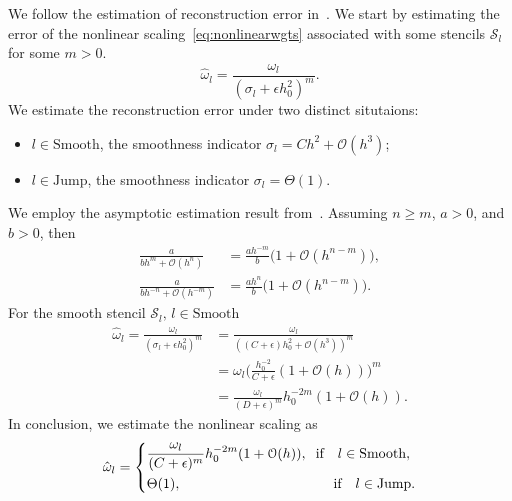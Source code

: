 We follow the estimation of reconstruction error in~\cite{MultiLevelWeno}.
We start by estimating the error of the nonlinear scaling~\eqref{eq:nonlinearwgts} 
associated with some stencils $\mathcal{S}_l$
for some $m>0$.
\begin{equation}
\hat{\omega}_l = \frac{\omega_l}{(\sigma_l + \epsilon h_0^2)^m}.
\end{equation}
We estimate the reconstruction error under two distinct situtaions:
\begin{itemize}
\item $l \in \text{Smooth}$, the smoothness indicator $\sigma_l = Ch^2 + \mathcal{O}(h^3)$; 
\item $l \in \text{Jump}$, the smoothness indicator $\sigma_l = \Theta(1)$.
\end{itemize}
We employ the asymptotic estimation result from~\cite{olver1997asymptotics}. 
Assuming $n\geq m$, 
$a>0$, and $b>0$, then
\begin{equation}\label{eq:asymptoticresult}
\begin{aligned}
\frac{a}{bh^m + \mathcal{O}(h^n)} &= \frac{ah^{-m}}{b} \big(1 + \mathcal{O}(h^{n-m})\big),\\
\frac{a}{bh^{-n} + \mathcal{O}(h^{-m})} &= \frac{ah^{n}}{b} \big(1 + \mathcal{O}(h^{n-m})\big).
\end{aligned}
\end{equation}
For the smooth stencil $\mathcal{S}_l,\,  l\in \text{Smooth}$
\begin{equation}
\begin{aligned}
\hat{\omega}_l = \frac{\omega_l}{(\sigma_l+ \epsilon h_0^2)^m} &= \frac{\omega_l}{((C+\epsilon)h^2_0 + \mathcal{O}(h^3))^m}\\
               &= \omega_l \Big(\frac{h_0^{-2}}{C+\epsilon}(1+\mathcal{O}(h))  \Big)^m \\
					&= \frac{\omega_l}{(D+\epsilon)^m}h_0^{-2m} (1+\mathcal{O}(h)) .
\end{aligned}
\end{equation}
In conclusion, we estimate the nonlinear scaling as
\begin{equation}\label{eq:estimatenonlinscale}
\hat{\omega}_l = \left\{  
\begin{aligned}
&\frac{\omega_l}{(C+\epsilon)^m}h_0^{-2m} (1+\mathcal{O}(h)), \hspace{0.2cm} \text{if} \quad l \in \text{Smooth},\\
&\Theta (1), \hspace{3.83cm} \text{if} \quad l \in \text{Jump}.
\end{aligned}
      \right.
\end{equation}
